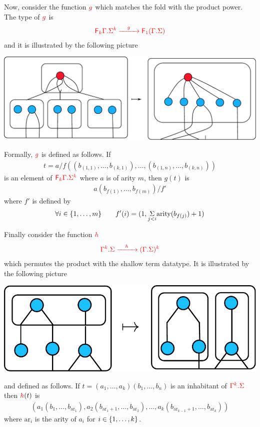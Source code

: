 Now, consider the function ${\color{red}{g}}$ which matches the fold with the product power. The type of ${\color{red}{g}}$ is
\begin{align*}
{\color{red}{{\color{red}{{\color{red}{\mathsf F_{k}}}\Gamma . \Sigma^k}} \xrightarrow{\quad g\quad} {\color{red}{\mathsf F_{1}}}({\color{red}{\Gamma . \Sigma}})}} 
\end{align*}
and it is illustrated by the following picture  
\begin{center}
\includegraphics[scale=.37]{pictures/shallow-unfold}
\end{center}
Formally, ${\color{red}{g}}$ is defined as follows. If 
\begin{align*}
t=a/f((b_{(1,1)},\dots,b_{(k,1)}),\dots, (b_{(1,n)},\dots,b_{(k,n)}))
\end{align*}
is an element of ${\color{red}{{\color{red}{{\color{red}{\mathsf F_{k}}}\Gamma . \Sigma^k}}  }}$ where $a$ is of arity $m$, then $g(t)$ is 
\begin{align*}
a(b_{f(1)},\dots,b_{f(m)})/f'
\end{align*}
where $f'$ is defined by 
\begin{align*}
\forall i\in\{1,\dots,m\} \qquad  f'(i)=(1, \underset{j<i}{\Sigma} \mathrm{arity}(b_{f(j)})+1)
\end{align*}
\smallskip

Finally consider the function ${\color{red}{h}}$ 
\begin{align*}
{\color{red}{{\color{red}{\Gamma^k . \Sigma}} \xrightarrow{\quad h\quad} ({\color{red}{\Gamma . \Sigma}})^k}} 
\end{align*}
which permutes the product with  the shallow term datatype. It is illustrated by the following picture  
\begin{center}
{\includegraphics[scale=.4]{pictures/tensor-shallow-distrib}}
\end{center}
and defined as follows. If $t=(a_1,\dots,a_k)(b_1,\dots,b_n)$ is an inhabitant of ${\color{red}{{\color{red}{\Gamma^k . \Sigma}}}}$ then ${\color{red}{h}}(t)$ is
\begin{align*}
(a_1(b_1,\dots,b_{\text{ar}_1}), a_2(b_{\text{ar}_1+1},\dots,b_{\text{ar}_2}),\dots ,a_k(b_{\text{ar}_{k-1}+1},\dots,b_{\text{ar}_k}))
\end{align*} 
where $\text{ar}_i$ is the arity of $a_i$ for $i\in\{1,\dots,k\}$.

